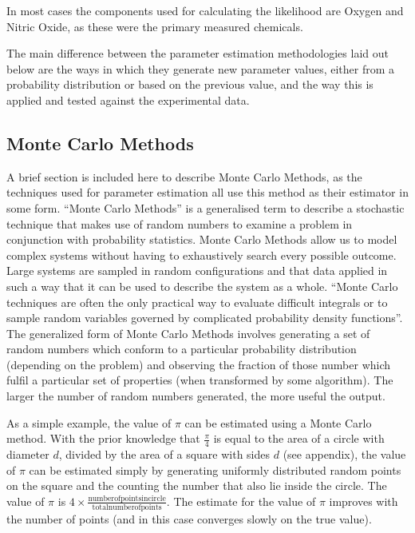 In most cases the components used for calculating the likelihood are Oxygen and Nitric Oxide, as these were the primary measured chemicals.

The main difference between the parameter estimation methodologies laid out below are the ways in which they generate new parameter values, either from a probability distribution or based on the previous value, and the way this is applied and tested against the experimental data.

\subsection*{Monte Carlo Methods}
A brief section is included here to describe Monte Carlo Methods, as the techniques used for parameter estimation all use this method as their estimator in some form.
``Monte Carlo Methods'' is a generalised term to describe a stochastic technique that makes use of random numbers to examine a problem in conjunction with probability statistics. Monte Carlo Methods allow us to model complex systems without having to exhaustively search every possible outcome. Large systems are sampled in random configurations and that data applied in such a way that it can be used to describe the system as a whole. ``Monte Carlo techniques are often the only practical way to evaluate difficult integrals or to sample random variables governed by complicated probability density functions''\cite{Nakamura2010}. The generalized form of Monte Carlo Methods involves generating a set of random numbers which conform to a particular probability distribution (depending on the problem) and observing the fraction of those number which fulfil a particular set of properties (when transformed by some algorithm). The larger the number of random numbers generated, the more useful the output.

As a simple example, the value of $\pi$ can be estimated using a Monte Carlo method. With the prior knowledge that $\frac{\pi}{4}$ is equal to the area of a circle with diameter $d$, divided by the area of a square with sides $d$ (see appendix), the value of $\pi$ can be estimated simply by generating uniformly distributed random points on the square and the counting the number that also lie inside the circle. The value of $\pi$ is $4\times\frac{\mathrm{number of points in circle}}{\mathrm{total number of points}}$. The estimate for the value of $\pi$ improves with the number of points (and in this case converges slowly on the true value).


